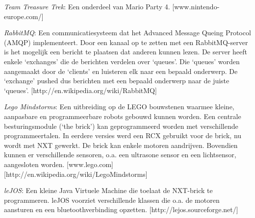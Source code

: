 \documentclass[eind]{penoverslag}
\begin{document}
\begin{thebibliography}{9}

\textit{Team Treasure Trek}: Een onderdeel van Mario Party 4. \mbox{[www.nintendo-europe.com/]}

\textit{RabbitMQ}: Een communicatiesysteem dat het Advanced Message Queing Protocol (AMQP) implementeert. Door een kanaal op te zetten met een RabbitMQ-server is het mogelijk een bericht te plaatsen dat anderen kunnen lezen. De server heeft enkele `exchanges' die de berichten verdelen over `queues'. Die `queues' worden aangemaakt door de `clients' en luisteren elk naar een bepaald onderwerp. De `exchange' pushed dus berichten met een bepaald onderwerp naar de juiste `queues'.
\mbox{[http://en.wikipedia.org/wiki/RabbitMQ]}

\textit{Lego Mindstorms}:  Een uitbreiding op de LEGO bouwstenen waarmee kleine, aanpasbare en programmeerbare robots gebouwd kunnen worden. Een centrale besturingsmodule (`the brick') kan geprogrammeerd worden met verschillende programmeertalen. In eerdere versies werd een RCX gebruikt voor de brick, nu wordt met NXT gewerkt. De brick kan enkele motoren aandrijven. Bovendien kunnen er verschillende sensoren, o.a. een ultrasone sensor en een lichtsensor, aangesloten worden.  \mbox{[www.lego.com]} \mbox{[http://en.wikipedia.org/wiki/Lego\textendash Mindstorms]}

\textit{leJOS}: Een kleine Java Virtuele Machine die toelaat de NXT-brick te programmeren. leJOS voorziet verschillende klassen die o.a. de motoren aansturen en een bluetoothverbinding opzetten.  \mbox{[http://lejos.sourceforge.net/]}

\end{thebibliography}
\end{document}
